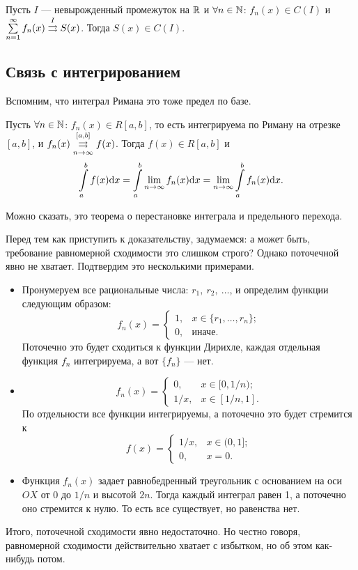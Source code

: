 \documentclass[a4paper, 12pt]{article}
\begin{document}
\begin{Consequence}
	Пусть $I$ --- невырожденный промежуток на $\mathbb{R}$ и $\forall n \in \mathbb{N}$: $f_n(x) \in C(I)$ и $\sum\limits_{n=1}^{\infty} f_n(x) \overset{I}{\rightrightarrows} S(x)$. Тогда $S(x) \in C(I)$. 
\end{Consequence}

\subsection{Связь с интегрированием}
Вспомним, что интеграл Римана это тоже предел по базе.
\begin{Statement}
	Пусть $\forall n \in \mathbb{N}$: $f_n(x) \in R[a, b]$, то есть интегрируема по Риману на отрезке $[a, b]$, и $f_n(x) \overset{[a, b]}{\underset{n \to \infty}{\rightrightarrows}} f(x)$.  Тогда $f(x) \in R[a, b]$ и 
	$$
	\int\limits_a^b f(x) \mathrm{d}x = \int\limits_a^b\lim\limits_{n \to \infty} f_n(x) \mathrm{d}x = \lim\limits_{n \to \infty} \int\limits_a^b f_n(x) \mathrm{d}x.
	$$
\end{Statement}

Можно сказать, это теорема о перестановке интеграла и предельного перехода.

Перед тем как приступить к доказательству, задумаемся: а может быть, требование равномерной сходимости это слишком строго? Однако поточечной явно не хватает. Подтвердим это несколькими примерами.
\begin{itemize}
\item
Пронумеруем все рациональные числа: $r_1,\ r_2,\ \ldots$, и определим функции следующим образом:
$$
f_n(x) = \begin{cases}
1, & x \in \{r_1, \ldots, r_n \}; \\
0, & \text{иначе}.
\end{cases}
$$
Поточечно это будет сходиться к функции Дирихле, каждая отдельная функция $f_n$ интегрируема, а вот $\{f_n\}$ --- нет. 
\item
$$
f_n(x) = \begin{cases}
0, & x \in [0, 1/n); \\
1/x, & x \in [1/n, 1].
\end{cases}
$$
По отдельности все функции интегрируемы, а поточечно это будет стремится к 
$$
f(x) = \begin{cases}
1/x, & x \in (0, 1]; \\
0, & x = 0.
\end{cases}
$$
\item
Функция $f_n(x)$ задает равнобедренный треугольник с основанием на оси $OX$ от 0 до $1/n$ и высотой $2n$. Тогда каждый интеграл равен 1, а поточечно оно стремится к нулю. То есть все существует, но равенства нет. 
\end{itemize}
Итого, поточечной сходимости явно недостаточно. Но честно говоря, равномерной сходимости действительно хватает с избытком, но об этом как-нибудь потом.
\end{document}
